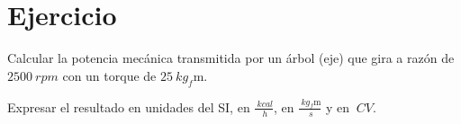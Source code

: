 \section{Ejercicio}\label{ej:Chap01Ejercicio07}

Calcular la potencia mecánica transmitida por un árbol (eje) que gira a razón de $\SI{2500}{rpm}$ con un torque de $\SI{25}{kg_f\meter}$. 

Expresar el resultado en unidades del SI, en $\frac{\SI{}{kcal}}{\SI{}{h}}$, en 
$\frac{\SI{}{kg_f\meter}}{\SI{}{s}}$ y en $\SI{}{CV}$.